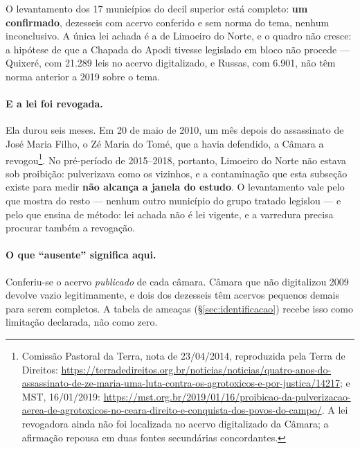 O levantamento dos 17 municípios do decil superior está completo: \textbf{um
confirmado}, dezesseis com acervo conferido e sem norma do tema, nenhum
inconclusivo. A única lei achada é a de Limoeiro do Norte, e o quadro não
cresce: a hipótese de que a Chapada do Apodi tivesse legislado em bloco não
procede --- Quixeré, com 21.289 leis no acervo digitalizado, e Russas, com
6.901, não têm norma anterior a 2019 sobre o tema.

\paragraph{E a lei foi revogada.} Ela durou seis meses. Em 20 de maio de 2010,
um mês depois do assassinato de José Maria Filho, o Zé Maria do Tomé, que a
havia defendido, a Câmara a revogou\footnote{Comissão Pastoral da Terra, nota de
23/04/2014, reproduzida pela Terra de Direitos:
\url{https://terradedireitos.org.br/noticias/noticias/quatro-anos-do-assassinato-de-ze-maria-uma-luta-contra-os-agrotoxicos-e-por-justica/14217};
e MST, 16/01/2019:
\url{https://mst.org.br/2019/01/16/proibicao-da-pulverizacao-aerea-de-agrotoxicos-no-ceara-direito-e-conquista-dos-povos-do-campo/}.
A lei revogadora ainda não foi localizada no acervo digitalizado da Câmara; a
afirmação repousa em duas fontes secundárias concordantes.}. No pré-período de
2015--2018, portanto, Limoeiro do Norte não estava sob proibição: pulverizava
como os vizinhos, e a contaminação que esta subseção existe para medir
\textbf{não alcança a janela do estudo}. O levantamento vale pelo que mostra do
resto --- nenhum outro município do grupo tratado legislou --- e pelo que ensina
de método: lei achada não é lei vigente, e a varredura precisa procurar também a
revogação.

\paragraph{O que ``ausente'' significa aqui.}
Conferiu-se o acervo \emph{publicado} de cada câmara. Câmara que não digitalizou
2009 devolve vazio legitimamente, e dois dos dezesseis têm acervos pequenos
demais para serem completos. A tabela de ameaças (§\ref{sec:identificacao})
recebe isso como limitação declarada, não como zero.
